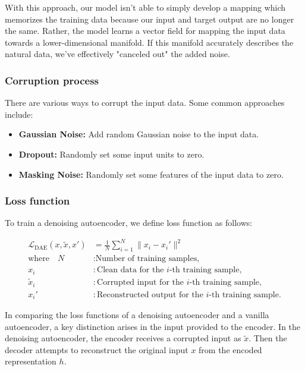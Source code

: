 \documentclass{article}
\begin{document}
		With this approach, our model isn't able to simply develop a mapping which memorizes the training data because our input and target output are no longer the same. Rather, the model learns a vector field for mapping the input data towards a lower-dimensional manifold. If this manifold accurately describes the natural data, we've effectively "canceled out" the added noise.

		\subsubsection{Corruption process}

			There are various ways to corrupt the input data. Some common approaches include:

			\begin{itemize}
				\item \textbf{Gaussian Noise:} Add random Gaussian noise to the input data.
				\item \textbf{Dropout:} Randomly set some input units to zero.
				\item \textbf{Masking Noise:} Randomly set some features of the input data to zero.
			\end{itemize}

		\subsubsection{Loss function}

			To train a denoising autoencoder, we define loss function as follows:

			\begin{align}
				\mathcal{L}_{\text{DAE}}(x, \tilde{x}, x') &= \frac{1}{N} \sum_{i=1}^{N} \|x_i - x_i'\|^2 \\
				\text{where} \quad N & : \text{Number of training samples,} \nonumber \\
				x_i & : \text{Clean data for the } i\text{-th training sample,} \nonumber \\
				\tilde{x}_i & : \text{Corrupted input for the } i\text{-th training sample,} \nonumber \\
				x_i' & : \text{Reconstructed output for the } i\text{-th training sample.} \nonumber
			\end{align}


			In comparing the loss functions of a denoising autoencoder and a vanilla autoencoder, a key distinction arises in the input provided to the encoder. In the denoising autoencoder, the encoder receives a corrupted input as \(\tilde{x}\). Then the decoder attempts to reconstruct the original input \(x\) from the encoded representation \(h\). 
			
\end{document}
